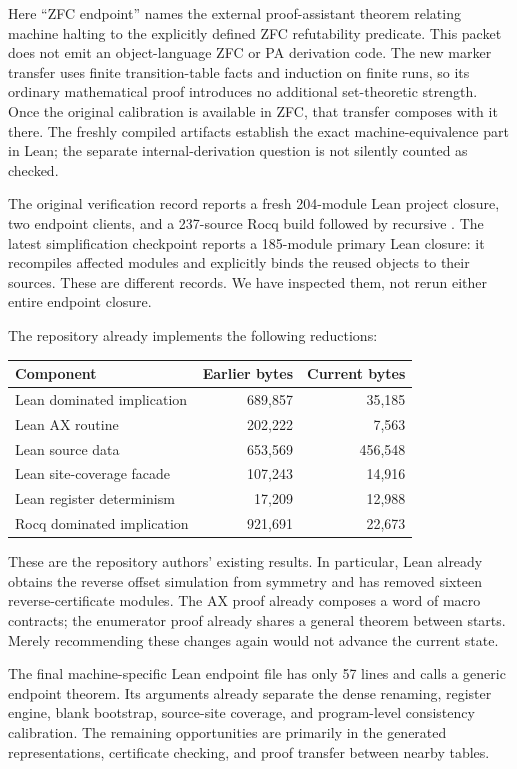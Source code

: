 \documentclass[11pt]{article}
\newcommand{\code}[1]{\texttt{\detokenize{#1}}}
\begin{document}
Here ``ZFC endpoint'' names the external proof-assistant theorem relating machine halting to the explicitly defined ZFC refutability predicate. This packet does not emit an object-language ZFC or PA derivation code. The new marker transfer uses finite transition-table facts and induction on finite runs, so its ordinary mathematical proof introduces no additional set-theoretic strength. Once the original calibration is available in ZFC, that transfer composes with it there. The freshly compiled artifacts establish the exact machine-equivalence part in Lean; the separate internal-derivation question is not silently counted as checked.


The original verification record reports a fresh 204-module Lean project closure, two endpoint clients, and a 237-source Rocq build followed by recursive \code{coqchk}. The latest simplification checkpoint reports a 185-module primary Lean closure: it recompiles affected modules and explicitly binds the reused objects to their sources. These are different records. We have inspected them, not rerun either entire endpoint closure.

The repository already implements the following reductions:
\begin{center}
\begin{tabular}{@{}lrr@{}}
\toprule
Component & Earlier bytes & Current bytes \\
\midrule
Lean dominated implication & 689,857 & 35,185 \\
Lean AX routine & 202,222 & 7,563 \\
Lean source data & 653,569 & 456,548 \\
Lean site-coverage facade & 107,243 & 14,916 \\
Lean register determinism & 17,209 & 12,988 \\
Rocq dominated implication & 921,691 & 22,673 \\
\bottomrule
\end{tabular}
\end{center}
These are the repository authors' existing results. In particular, Lean already obtains the reverse offset simulation from symmetry and has removed sixteen reverse-certificate modules. The AX proof already composes a word of macro contracts; the enumerator proof already shares a general theorem between starts. Merely recommending these changes again would not advance the current state.

The final machine-specific Lean endpoint file has only 57 lines and calls a generic endpoint theorem. Its arguments already separate the dense renaming, register engine, blank bootstrap, source-site coverage, and program-level consistency calibration. The remaining opportunities are primarily in the generated representations, certificate checking, and proof transfer between nearby tables.
\end{document}
